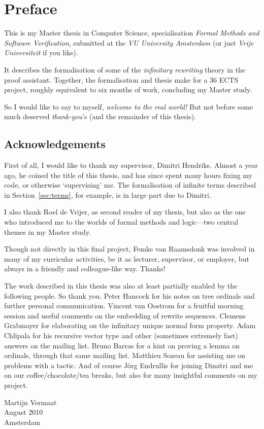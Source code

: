 \chapter*{Preface}
\thispagestyle{empty}

This is my Master thesis in Computer Science,
specialisation \emph{Formal Methods and Software Verification},
submitted at the \emph{VU University Amsterdam} (or just \emph{Vrije
  Universiteit} if you like).

It describes the formalisation of some of the \emph{infinitary
  rewriting} theory in the \Coq proof assistant.
Together, the formalisation and thesis make
for a 36 ECTS project, roughly equivalent to six months of work,
concluding my Master study.

So I would like to say to myself, \emph{welcome to the real world!}
But not before some much deserved \emph{thank-you}'s (and the
remainder of this thesis).


\section*{Acknowledgements}

First of all, I would like to thank my supervisor, Dimitri
Hendriks. Almost a year ago, he coined the title of this thesis, and
has since spent many hours fixing my \Coq code, or otherwise
`supervising' me. The formalisation of infinite terms described in
Section~\ref{sec:terms}, for example, is in large part due to
Dimitri.

I also thank Roel de Vrijer, as second reader of my thesis, but also
as the one who introduced me to the worlds of formal methods and
logic---two central themes in my Master study.

Though not directly in this final project, Femke van Raamsdonk was
involved in many of my curricular activities, be it as lecturer,
supervisor, or employer, but always in a friendly and colleague-like
way. Thanks!

The work described in this thesis was also at least partially enabled
by the following people. So thank you. Peter Hancock for his notes on
tree ordinals and further personal communication. Vincent van Oostrom
for a fruitful morning session and useful comments on the embedding of
rewrite sequences. Clemens Grabmayer for elaborating on the infinitary
unique normal form property. Adam Chlipala for his recursive vector type and
other (sometimes extremely fast) answers on the \Coq mailing
list. Bruno Barras for a hint on proving a lemma on ordinals, through
that same mailing list. Matthieu Sozeau for assisting me on problems
with a \Coq tactic. And of course J\"org Endrullis for joining Dimitri
and me on our coffee/chocolate/tea breaks, but also for many insightful
comments on my project.


\thispagestyle{empty}

\begin{flushright}
  Martijn Vermaat\\
  August 2010\\
  Amsterdam
\end{flushright}
